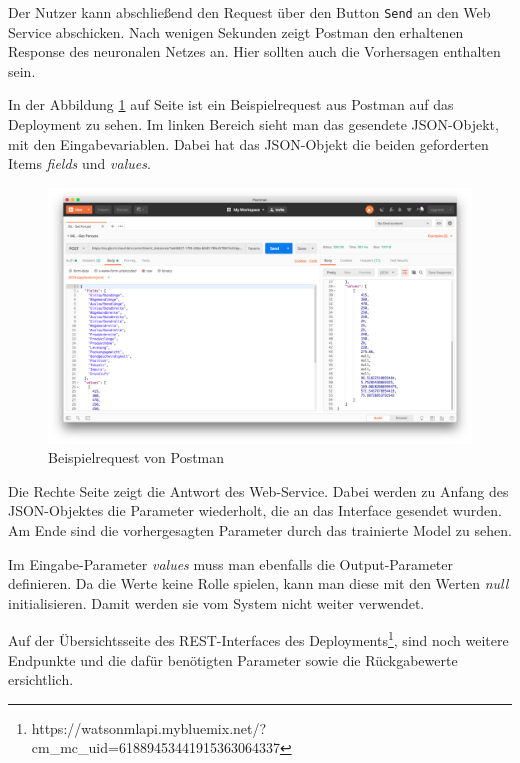 Der Nutzer kann abschließend den Request über den Button \texttt{Send} an den Web Service abschicken. Nach wenigen
Sekunden zeigt Postman den erhaltenen Response des neuronalen Netzes an. Hier sollten auch die Vorhersagen enthalten sein.

In der Abbildung \ref{fig:umsetzung_deployment_postman} auf Seite \pageref{fig:umsetzung_deployment_postman} ist ein
Beispielrequest aus Postman auf das Deployment zu sehen. Im linken Bereich sieht man das gesendete JSON-Objekt, mit den
Eingabevariablen. Dabei hat das JSON-Objekt die beiden geforderten Items \textit{fields} und \textit{values}.

\begin{figure}[h]
    \centering
    \includegraphics[width=\textwidth]{images/kapitel_3/deployment_postman.png}
    \caption{Beispielrequest von Postman}
    \label{fig:umsetzung_deployment_postman}
\end{figure}

Die Rechte Seite zeigt die Antwort des Web-Service. Dabei werden zu Anfang des JSON-Objektes die Parameter wiederholt,
die an das Interface gesendet wurden. Am Ende sind die vorhergesagten Parameter durch das trainierte Model zu sehen.

Im Eingabe-Parameter \textit{values} muss man ebenfalls die Output-Parameter definieren. Da die Werte keine Rolle
spielen, kann man diese mit den Werten \textit{null} initialisieren. Damit werden sie vom System nicht weiter verwendet.

Auf der Übersichtsseite des REST-Interfaces des
Deployments\footnote{https://watson\-ml\-api.mybluemix.net/?cm\_mc\_uid=61889453441915363064337}, sind noch weitere
Endpunkte und die dafür benötigten Parameter sowie die Rückgabewerte ersichtlich.


